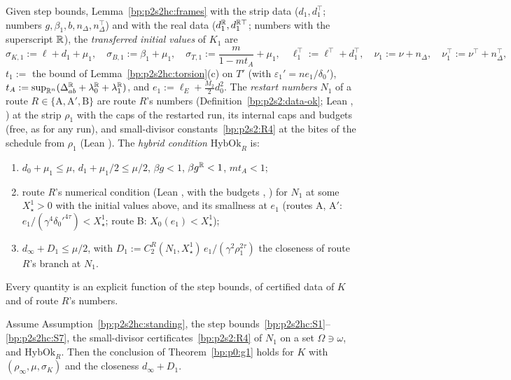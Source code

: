 \begin{definition}\label{bp:p2s2hc:data}
Given step bounds, Lemma~\ref{bp:p2s2hc:frames} with the strip data ($d_1,d_1^\top$; numbers $g,\beta_1,b,n_\Delta,n_\Delta^\top$) and with the real data
($d_1^{\mathbb{R}},d_1^{\mathbb{R}\top}$; numbers with the superscript $\mathbb{R}$), the \emph{transferred initial values} of $K_1$ are
\[
\sigma_{K,1}:=\ell+d_1+\mu_1,\quad\sigma_{B,1}:=\beta_1+\mu_1,\quad\sigma_{T,1}:=\frac{m}{1-mt_A}+\mu_1,\quad
\ell_1^\top:=\ell^\top+d_1^\top,\quad\nu_1:=\nu+n_\Delta,\quad\nu_1^\top:=\nu^\top+n_\Delta^\top,
\]
$t_1:=$ the bound of Lemma~\ref{bp:p2s2hc:torsion}(c) on $T'$ (with $\varepsilon_1'=ne_1/\delta_0'$), $t_A:=\sup_{\mathbb{R}^n}(\Delta_{ab}^{\mathbb{R}}+\lambda_0^{\mathbb{R}}+\lambda_1^{\mathbb{R}})$, and
$e_1:=\ell_E+\frac{M_2}2d_0^2$. The \emph{restart numbers} $N_1$ of a route $R\in\{\mathrm A,\mathrm A',\mathrm B\}$ are route $R$'s numbers
(Definition~\ref{bp:p2s2:data-ok}; Lean , ) at the strip $\rho_1$ with the caps of the restarted run, its internal caps
and budgets (free, as for any run), and small-divisor constants~\ref{bp:p2s2:R4} at the bites of the schedule from $\rho_1$ (Lean
). The \emph{hybrid condition} $\mathrm{HybOk}_R$ is:
\begin{enumerate}[label=(\roman*)]
\item $d_0+\mu_1\le\mu$, $d_1+\mu_1/2\le\mu/2$, $\beta g<1$, $\beta g^{\mathbb{R}}<1$, $mt_A<1$;
\item route $R$'s numerical condition (Lean ,  with the budgets , ) for $N_1$ at some
  $X_\star^1>0$ with the initial values above, and its smallness at $e_1$ (routes A, A$'$: $e_1/(\gamma^4\delta_0'^{4\tau})<X_\star^1$; route B: $X_0(e_1)<X_\star^1$);
\item $d_\infty+D_1\le\mu/2$, with $D_1:=C_2^R(N_1,X_\star^1)\,e_1/(\gamma^2\rho_1^{2\tau})$ the closeness of route $R$'s branch at $N_1$.
\end{enumerate}
Every quantity is an explicit function of the step bounds, of certified data of $K$ and of route $R$'s numbers.
\end{definition}

\begin{theorem}\label{bp:p2s2hc:g1}
Assume Assumption~\ref{bp:p2s2hc:standing}, the step bounds~\ref{bp:p2s2hc:S1}--\ref{bp:p2s2hc:S7}, the small-divisor certificates~\ref{bp:p2s2:R4}
of $N_1$ on a set $\Omega\ni\omega$, and $\mathrm{HybOk}_R$. Then the conclusion of Theorem~\ref{bp:p0:g1} holds for $K$ with $(\rho_\infty,\mu,\sigma_K)$ and
the closeness $d_\infty+D_1$.
\end{theorem}

